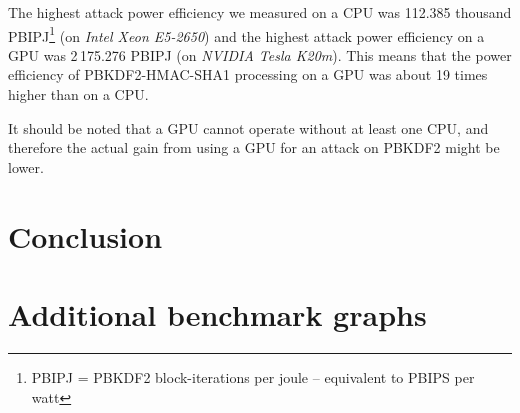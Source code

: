 \documentclass[12pt,oneside]{fithesis2}
\begin{document}
      The highest attack power efficiency we measured on a CPU was 112.385 thousand PBIPJ\footnote{PBIPJ = PBKDF2 block-iterations per joule -- equivalent to PBIPS per watt} (on \emph{Intel Xeon E5-2650}) and the highest attack power efficiency on a GPU was 2\,175.276 PBIPJ (on \emph{NVIDIA Tesla K20m}). This means that the power efficiency of PBKDF2-HMAC-SHA1 processing on a GPU was about 19 times higher than on a CPU.
      
      It should be noted that a GPU cannot operate without at least one CPU, and therefore the actual gain from using a GPU for an attack on PBKDF2 might be lower.
      
      
    \chapter{Conclusion}
    \appendix
    \chapter{Additional benchmark graphs}        %
    
    
    
    
    
\end{document}
